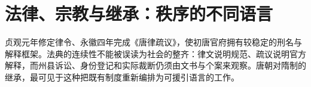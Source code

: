 \section{法律、宗教与继承：秩序的不同语言} \label{sec:tang-imperial-order}  贞观元年修定律令、永徽四年完成《唐律疏议》，使初唐官府拥有较稳定的刑名与解释框架。法典的连续性不能被误读为社会的整齐：律文说明规范、疏议说明官方解释，而州县诉讼、身份登记和实际裁断仍须由文书与个案来观察。唐朝对隋制的继承，最可见于这种把既有制度重新编排为可援引语言的工作。%